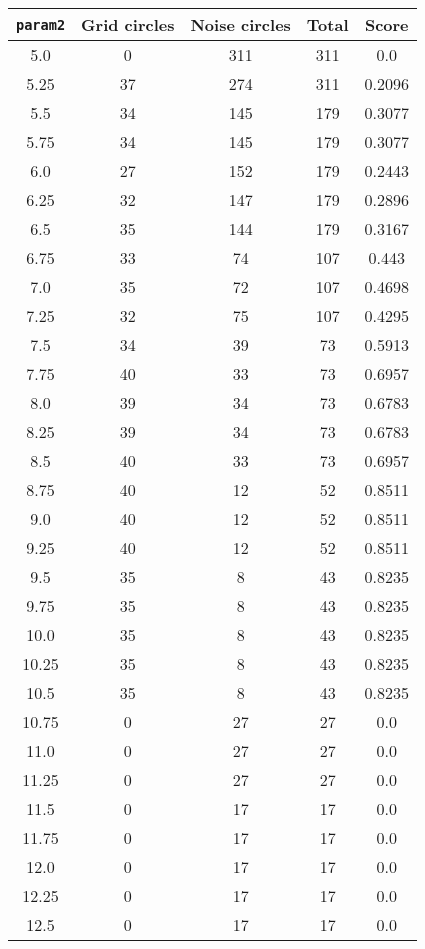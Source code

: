 \documentclass[letterpaper, 12pt]{article}
\begin{document}
\begin{longtable}{|c|c|c|c|c|}
\hline
\textbf{\texttt{param2}} & \textbf{Grid circles} & \textbf{Noise circles} & \textbf{Total} & \textbf{Score} \\
\hline
5.0 & 0 & 311 & 311 & 0.0 \\
\hline
5.25 & 37 & 274 & 311 & 0.2096 \\
\hline
5.5 & 34 & 145 & 179 & 0.3077 \\
\hline
5.75 & 34 & 145 & 179 & 0.3077 \\
\hline
6.0 & 27 & 152 & 179 & 0.2443 \\
\hline
6.25 & 32 & 147 & 179 & 0.2896 \\
\hline
6.5 & 35 & 144 & 179 & 0.3167 \\
\hline
6.75 & 33 & 74 & 107 & 0.443 \\
\hline
7.0 & 35 & 72 & 107 & 0.4698 \\
\hline
7.25 & 32 & 75 & 107 & 0.4295 \\
\hline
7.5 & 34 & 39 & 73 & 0.5913 \\
\hline
7.75 & 40 & 33 & 73 & 0.6957 \\
\hline
8.0 & 39 & 34 & 73 & 0.6783 \\
\hline
8.25 & 39 & 34 & 73 & 0.6783 \\
\hline
8.5 & 40 & 33 & 73 & 0.6957 \\
\hline
8.75 & 40 & 12 & 52 & 0.8511 \\
\hline
9.0 & 40 & 12 & 52 & 0.8511 \\
\hline
9.25 & 40 & 12 & 52 & 0.8511 \\
\hline
9.5 & 35 & 8 & 43 & 0.8235 \\
\hline
9.75 & 35 & 8 & 43 & 0.8235 \\
\hline
10.0 & 35 & 8 & 43 & 0.8235 \\
\hline
10.25 & 35 & 8 & 43 & 0.8235 \\
\hline
10.5 & 35 & 8 & 43 & 0.8235 \\
\hline
10.75 & 0 & 27 & 27 & 0.0 \\
\hline
11.0 & 0 & 27 & 27 & 0.0 \\
\hline
11.25 & 0 & 27 & 27 & 0.0 \\
\hline
11.5 & 0 & 17 & 17 & 0.0 \\
\hline
11.75 & 0 & 17 & 17 & 0.0 \\
\hline
12.0 & 0 & 17 & 17 & 0.0 \\
\hline
12.25 & 0 & 17 & 17 & 0.0 \\
\hline
12.5 & 0 & 17 & 17 & 0.0 \\

\end{longtable}
\end{document}
